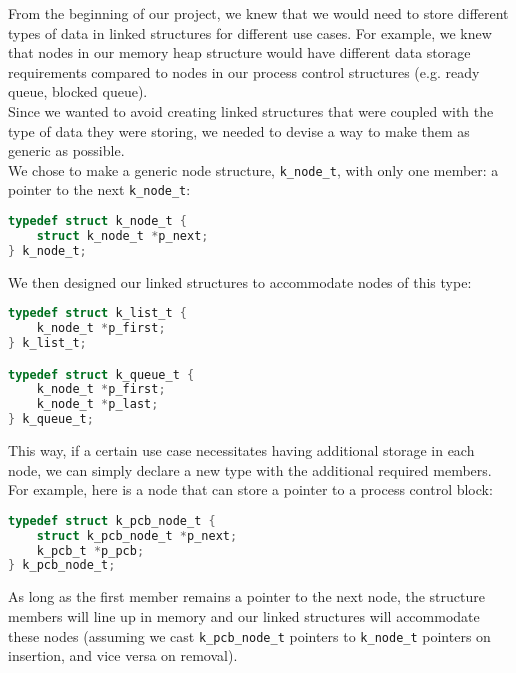 \documentclass[12pt]{report}
\begin{document}
From the beginning of our project, we knew that we would need to store different types of data in linked structures for different use cases. For example, we knew that nodes in our memory heap structure would have different data storage requirements compared to nodes in our process control structures (e.g. ready queue, blocked queue).\\

Since we wanted to avoid creating linked structures that were coupled with the type of data they were storing, we needed to devise a way to make them as generic as possible.\\

We chose to make a generic node structure, \texttt{k_node_t}, with only one member: a pointer to the next \texttt{k_node_t}:

\begin{minipage}{\textwidth}
\begin{lstlisting}[language=C]
typedef struct k_node_t {
    struct k_node_t *p_next;
} k_node_t;
\end{lstlisting}
\end{minipage}

We then designed our linked structures to accommodate nodes of this type:

\begin{minipage}{\textwidth}
\begin{lstlisting}[language=C]
typedef struct k_list_t {
    k_node_t *p_first;
} k_list_t;

typedef struct k_queue_t {
    k_node_t *p_first;
    k_node_t *p_last;
} k_queue_t;
\end{lstlisting}
\end{minipage}

This way, if a certain use case necessitates having additional storage in each node, we can simply declare a new type with the additional required members. For example, here is a node that can store a pointer to a process control block:

\begin{minipage}{\textwidth}
\begin{lstlisting}[language=C]
typedef struct k_pcb_node_t {
    struct k_pcb_node_t *p_next;
    k_pcb_t *p_pcb;
} k_pcb_node_t;
\end{lstlisting}
\end{minipage}

As long as the first member remains a pointer to the next node, the structure members will line up in memory and our linked structures will accommodate these nodes (assuming we cast \texttt{k_pcb_node_t} pointers to \texttt{k_node_t} pointers on insertion, and vice versa on removal).
\end{document}
